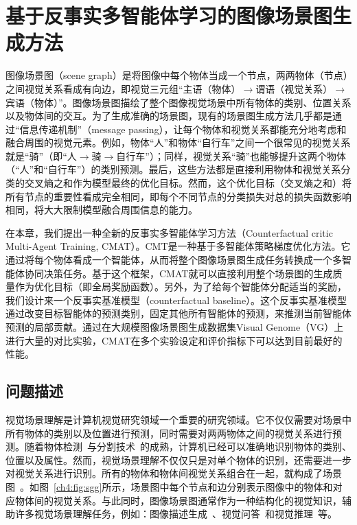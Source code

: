 \chapter{基于反事实多智能体学习的图像场景图生成方法}

图像场景图（scene graph）是将图像中每个物体当成一个节点，两两物体（节点）之间视觉关系看成有向边，即视觉三元组“主语（物体）$\to$谓语（视觉关系）$\to$宾语（物体）”。图像场景图描绘了整个图像视觉场景中所有物体的类别、位置关系以及物体间的交互。为了生成准确的场景图，现有的场景图生成方法几乎都是通过“信息传递机制”（message passing），让每个物体和视觉关系都能充分地考虑和融合周围的视觉元素。例如，物体“人”和物体“自行车”之间一个很常见的视觉关系就是“骑”（即“人$\to$骑$\to$自行车”）；同样，视觉关系“骑”也能够提升这两个物体（“人”和“自行车”）的类别预测。最后，这些方法都是直接利用物体和视觉关系分类的交叉熵之和作为模型最终的优化目标。然而，这个优化目标（交叉熵之和）将所有节点的重要性看成完全相同，即每个不同节点的分类损失对总的损失函数影响相同，将大大限制模型融合周围信息的能力。

在本章，我们提出一种全新的反事实多智能体学习方法（Counterfactual critic Multi-Agent Training, CMAT）。CMT是一种基于多智能体策略梯度优化方法。它通过将每个物体看成一个智能体，从而将整个图像场景图生成任务转换成一个多智能体协同决策任务。基于这个框架，CMAT就可以直接利用整个场景图的生成质量作为优化目标（即全局奖励函数）。另外，为了给每个智能体分配适当的奖励，我们设计来一个反事实基准模型（counterfactual baseline）。这个反事实基准模型通过改变目标智能体的预测类别，固定其他所有智能体的预测，来推测当前智能体预测的局部贡献。通过在大规模图像场景图生成数据集Visual Genome（VG）上进行大量的对比实验，CMAT在多个实验设定和评价指标下可以达到目前最好的性能。


\section{问题描述}

视觉场景理解是计算机视觉研究领域一个重要的研究领域。它不仅仅需要对场景中所有物体的类别以及位置进行预测，同时需要对两两物体之间的视觉关系进行预测。随着物体检测~\cite{ren2015faster,liu2016ssd}与分割技术~\cite{long2015fully,he2017mask}的成熟，计算机已经可以准确地识别物体的类别、位置以及属性。然而，视觉场景理解不仅仅只是对单个物体的识别，还需要进一步对视觉关系进行识别。所有的物体和物体间视觉关系组合在一起，就构成了场景图~\cite{johnson2015image}。如图~\ref{ch4:fig:sgg}所示，场景图中每个节点和边分别表示图像中的物体和对应物体间的视觉关系。与此同时，图像场景图通常作为一种结构化的视觉知识，辅助许多视觉场景理解任务，例如：图像描述生成~\cite{yao2018exploring,yang2019auto,kim2019dense}、视觉问答~\cite{norcliffe2018learning,hudson2019gqa}和视觉推理~\cite{shi2019explainable,haurilet2019s}等。

